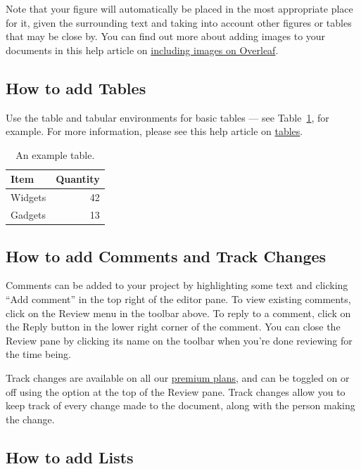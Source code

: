 \documentclass{article}
\begin{document}
Note that your figure will automatically be placed in the most appropriate place for it, given the surrounding text and taking into account other figures or tables that may be close by. You can find out more about adding images to your documents in this help article on \href{https://www.overleaf.com/learn/how-to/Including_images_on_Overleaf}{including images on Overleaf}.


\subsection{How to add Tables}

Use the table and tabular environments for basic tables --- see Table~\ref{tab:widgets}, for example. For more information, please see this help article on \href{https://www.overleaf.com/learn/latex/tables}{tables}. 

\begin{table}
\centering
\begin{tabular}{l|r}
Item & Quantity \\\hline
Widgets & 42 \\
Gadgets & 13
\end{tabular}
\caption{\label{tab:widgets}An example table.}
\end{table}

\subsection{How to add Comments and Track Changes}

Comments can be added to your project by highlighting some text and clicking ``Add comment'' in the top right of the editor pane. To view existing comments, click on the Review menu in the toolbar above. To reply to a comment, click on the Reply button in the lower right corner of the comment. You can close the Review pane by clicking its name on the toolbar when you're done reviewing for the time being.

Track changes are available on all our \href{https://www.overleaf.com/user/subscription/plans}{premium plans}, and can be toggled on or off using the option at the top of the Review pane. Track changes allow you to keep track of every change made to the document, along with the person making the change. 

\subsection{How to add Lists}
\end{document}
